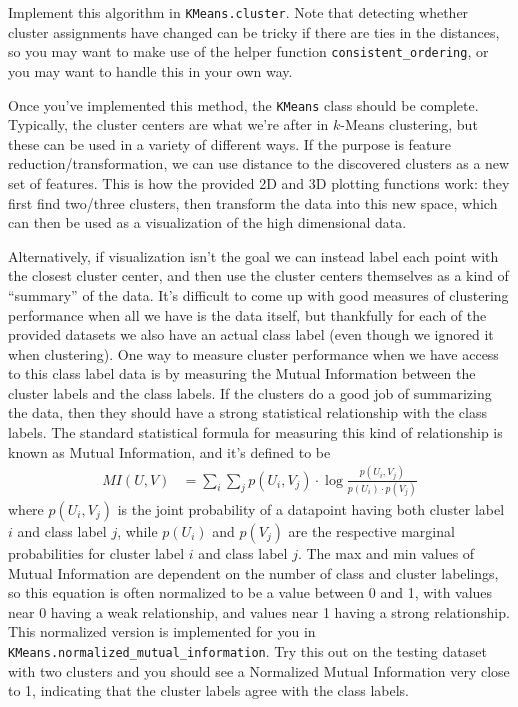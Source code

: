 \documentclass{article}
\begin{document}
Implement this algorithm in \texttt{KMeans.cluster}. Note that detecting whether cluster assignments have changed can be tricky if there are ties in the distances, so you may want to make use of the helper function \texttt{consistent\_ordering}, or you may want to handle this in your own way.

Once you've implemented this method, the \texttt{KMeans} class should be complete. Typically, the cluster centers are what we're after in \(k\)-Means clustering, but these can be used in a variety of different ways. If the purpose is feature reduction/transformation, we can use distance to the discovered clusters as a new set of features. This is how the provided 2D and 3D plotting functions work: they first find two/three clusters, then transform the data into this new space, which can then be used as a visualization of the high dimensional data. 

Alternatively, if visualization isn't the goal we can instead label each point with the closest cluster center, and then use the cluster centers themselves as a kind of ``summary'' of the data. It's difficult to come up with good measures of clustering performance when all we have is the data itself, but thankfully for each of the provided datasets we also have an actual class label (even though we ignored it when clustering). One way to measure cluster performance when we have access to this class label data is by measuring the Mutual Information between the cluster labels and the class labels. If the clusters do a good job of summarizing the data, then they should have a strong statistical relationship with the class labels. The standard statistical formula for measuring this kind of relationship is known as Mutual Information, and it's defined to be
\begin{align*}
	MI(U,V) &= \sum_i\sum_j p(U_i,V_j) \cdot \log\frac{p(U_i,V_j)}{p(U_i)\cdot p(V_j)}
\end{align*}
where \(p(U_i,V_j)\) is the joint probability of a datapoint having both cluster label \(i\) and class label \(j\), while \(p(U_i)\) and \(p(V_j)\) are the respective marginal probabilities for cluster label \(i\) and class label \(j\). The max and min values of Mutual Information are dependent on the number of class and cluster labelings, so this equation is often normalized to be a value between 0 and 1, with values near 0 having a weak relationship, and values near 1 having a strong relationship. This normalized version is implemented for you in \texttt{KMeans.normalized\_mutual\_information}. Try this out on the testing dataset with two clusters and you should see a Normalized Mutual Information very close to 1, indicating that the cluster labels agree with the class labels.
\end{document}
